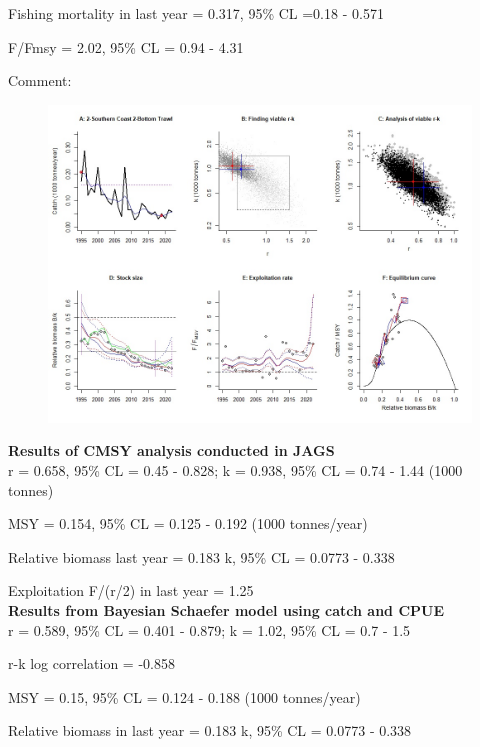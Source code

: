 \documentclass[12pt,a4paper]{article}\usepackage[]{graphicx}\usepackage[]{xcolor}
\begin{document}
Fishing mortality in last year = 0.317, 95\% CL =0.18 - 0.571

F/Fmsy  = 2.02, 95\% CL = 0.94 - 4.31 

 Comment:  

    \pagebreak

    \begin{figure}[ht]
    \centering
    \includegraphics[width=1.00\textwidth ext=.jpg type=jpg]{2-Southern Coast 2-Bottom Trawl_AN.jpg}
    \end{figure}

    \textbf{Results of CMSY analysis conducted in JAGS}\\

r = 0.658, 95\% CL = 0.45 - 0.828; k = 0.938, 95\% CL = 0.74 - 1.44 (1000 tonnes)

MSY = 0.154, 95\% CL = 0.125 - 0.192 (1000 tonnes/year)

Relative biomass last year = 0.183 k, 95\% CL = 0.0773 - 0.338

Exploitation F/(r/2) in last year = 1.25 \\

\textbf{Results from Bayesian Schaefer model using catch and CPUE}\\

r = 0.589, 95\% CL = 0.401 - 0.879; k = 1.02, 95\% CL = 0.7 - 1.5

r-k log correlation = -0.858

MSY = 0.15, 95\% CL = 0.124 - 0.188 (1000 tonnes/year)

Relative biomass in last year = 0.183 k, 95\% CL = 0.0773 - 0.338
\end{document}
